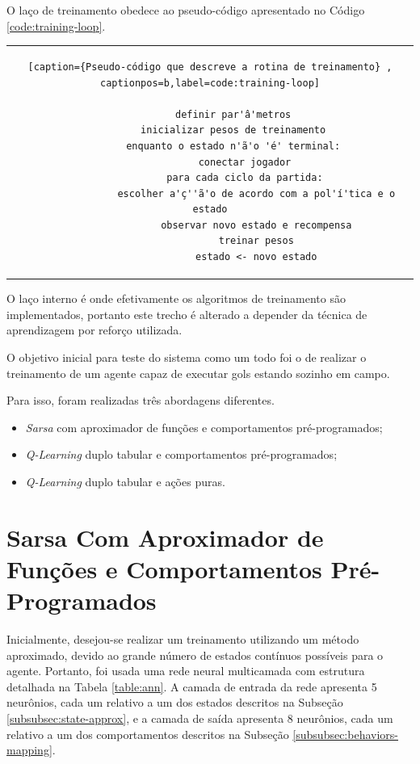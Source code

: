 O laço de treinamento obedece ao pseudo-código apresentado no Código \ref{code:training-loop}.

\begin{tabular}{c}
	\begin{lstlisting}[caption={Pseudo-código que descreve a rotina de treinamento} , captionpos=b,label=code:training-loop]
		
		definir par'â'metros
		inicializar pesos de treinamento
		enquanto o estado n'ã'o 'é' terminal:
			conectar jogador
			para cada ciclo da partida:
				escolher a'ç''ã'o de acordo com a pol'í'tica e o estado
				observar novo estado e recompensa
				treinar pesos
				estado <- novo estado
	\end{lstlisting}
\end{tabular}

O laço interno é onde efetivamente os algoritmos de treinamento são implementados, portanto este trecho é alterado a depender da técnica de aprendizagem por reforço utilizada.

O objetivo inicial para teste do sistema como um todo foi o de realizar o treinamento de um agente capaz de executar gols estando sozinho em campo.

Para isso, foram realizadas três abordagens diferentes.

\begin{itemize}
	\item \textit{Sarsa} com aproximador de funções e comportamentos pré-programados;
	\item \textit{Q-Learning} duplo tabular e comportamentos pré-programados;
	\item \textit{Q-Learning} duplo tabular e ações puras.
\end{itemize}

\section{Sarsa Com Aproximador de Funções e Comportamentos Pré-Programados}
\label{subsec:sarsadev}
\par Inicialmente, desejou-se realizar um treinamento utilizando um método aproximado, devido ao grande número de estados contínuos possíveis para o agente. Portanto, foi usada uma rede neural multicamada com estrutura detalhada na Tabela \ref{table:ann}. A camada de entrada da rede apresenta 5 neurônios, cada um relativo a um dos estados descritos na Subseção \ref{subsubsec:state-approx}, e a camada de saída apresenta 8 neurônios, cada um relativo a um dos comportamentos descritos na Subseção \ref{subsubsec:behaviors-mapping}.

